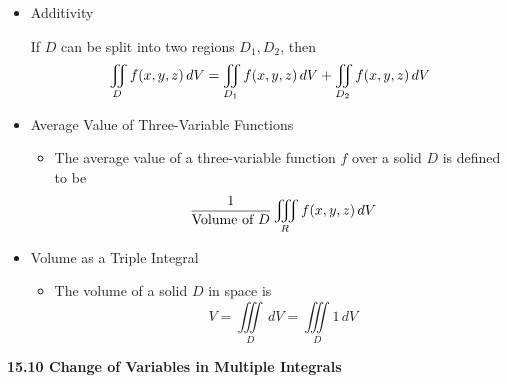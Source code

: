\begin{itemize}
  \item Additivity
  
  If $D$ can be split into two regions $D_1,D_2$, then
    \[\iint\limits_D f(x,y,z)\,d{V} = \iint\limits_{D_1} f(x,y,z)\,d{V} + \iint\limits_{D_2} f(x,y,z)\,d{V}\]

  \item Average Value of Three-Variable Functions
    \begin{itemize}
      \item The average value of a three-variable function $f$ over a solid $D$ is defined to be
        \[
          \frac{1}{\text{Volume of }D}\iiint_R f(x,y,z)\,d{V}
        \]
    \end{itemize}
  
  \item Volume as a Triple Integral
    
    \begin{itemize}
    \item The volume of a solid $D$ in space is \[V = \iiint\limits_D\,dV=\iiint\limits_D 1\,dV\]
    \end{itemize}
    
  \end{itemize}
  
  \newpage
  
  \centerline{\bf 15.10 Change of Variables in Multiple Integrals}
  
